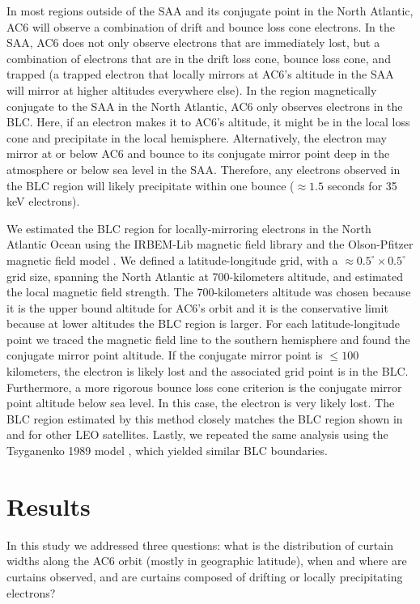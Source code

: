 \documentclass[draft]{agujournal2019}
\begin{document}
In most regions outside of the SAA and its conjugate point in the North Atlantic, AC6 will observe a combination of drift and bounce loss cone electrons. In the SAA, AC6 does not only observe electrons that are immediately lost, but a combination of electrons that are in the drift loss cone, bounce loss cone, and trapped (a trapped electron that locally mirrors at AC6's altitude in the SAA will mirror at higher altitudes everywhere else). In the region magnetically conjugate to the SAA in the North Atlantic, AC6 only observes electrons in the BLC. Here, if an electron makes it to AC6's altitude, it might be in the local loss cone and precipitate in the local hemisphere. Alternatively, the electron may mirror at or below AC6 and bounce to its conjugate mirror point deep in the atmosphere or below sea level in the SAA. Therefore, any electrons observed in the BLC region will likely precipitate within one bounce ($\approx 1.5$ seconds for 35 keV electrons). 

We estimated the BLC region for locally-mirroring electrons in the North Atlantic Ocean using the IRBEM-Lib magnetic field library and the Olson-Pfitzer magnetic field model \cite{irbem, Olson1982}. We defined a latitude-longitude grid, with a $\approx 0.5^\circ \times 0.5^\circ$ grid size, spanning the North Atlantic at 700-kilometers altitude, and estimated the local magnetic field strength. The 700-kilometers altitude was chosen because it is the upper bound altitude for AC6's orbit and it is the conservative limit because at lower altitudes the BLC region is larger. For each latitude-longitude point we traced the magnetic field line to the southern hemisphere and found the conjugate mirror point altitude. If the conjugate mirror point is $\leq 100$ kilometers, the electron is likely lost and the associated grid point is in the BLC. Furthermore, a more rigorous bounce loss cone criterion is the conjugate mirror point altitude below sea level. In this case, the electron is very likely lost. The BLC region estimated by this method closely matches the BLC region shown in  and  for other LEO satellites. Lastly, we repeated the same analysis using the Tsyganenko 1989 model \cite{Tsyganenko1989}, which yielded similar BLC boundaries.

\section{Results} \label{results}
In this study we addressed three questions: what is the distribution of curtain widths along the AC6 orbit (mostly in geographic latitude), when and where are curtains observed, and are curtains composed of drifting or locally precipitating electrons?
\end{document}
